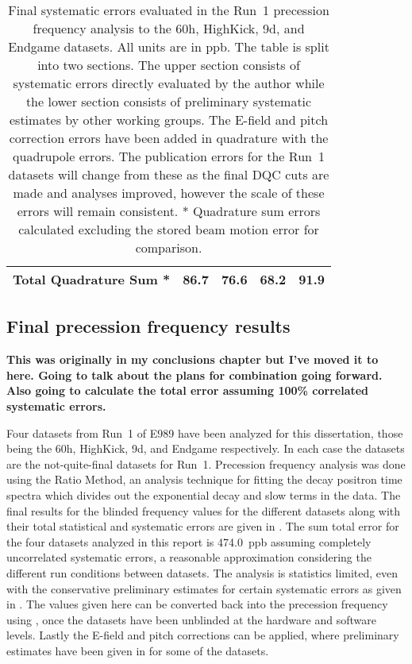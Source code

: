 \begin{table}
\begin{tabular*}{\linewidth}{@{\extracolsep{\fill}}lGGGG}
    Total Quadrature Sum * & 86.7 & 76.6 & 68.2 & 91.9 \\
  \hline
\end{tabular*}
\caption[Systematic errors evaluated in the Run~1 precession frequency datasets]{Final systematic errors evaluated in the Run~1 precession frequency analysis to the 60h, HighKick, 9d, and Endgame datasets. All units are in ppb. The table is split into two sections. The upper section consists of systematic errors directly evaluated by the author while the lower section consists of preliminary systematic estimates by other working groups. The E-field and pitch correction errors have been added in quadrature with the quadrupole errors. The publication errors for the Run~1 datasets will change from these as the final DQC cuts are made and analyses improved, however the scale of these errors will remain consistent. * Quadrature sum errors calculated excluding the stored beam motion error for comparison.}
\label{tab:FinalSystematicErrors}
\end{table}




\subsection{Final precession frequency results}


\textbf{This was originally in my conclusions chapter but I've moved it to here. Going to talk about the plans for combination going forward. Also going to calculate the total error assuming 100\% correlated systematic errors.}



Four datasets from Run~1 of E989 have been analyzed for this dissertation, those being the 60h, HighKick, 9d, and Endgame respectively. In each case the datasets are the not-quite-final datasets for Run~1. Precession frequency analysis was done using the Ratio Method, an analysis technique for fitting the decay positron time spectra which divides out the exponential decay and slow terms in the data. The final results for the blinded frequency \R values for the different datasets along with their total statistical and systematic errors are given in . The sum total error for the four datasets analyzed in this report is \SI{474.0}{ppb} assuming completely uncorrelated systematic errors, a reasonable approximation considering the different run conditions between datasets. The analysis is statistics limited, even with the conservative preliminary estimates for certain systematic errors as given in . The \R values given here can be converted back into the precession frequency \wa using , once the datasets have been unblinded at the hardware and software levels. Lastly the E-field and pitch corrections can be applied, where preliminary estimates have been given in  for some of the datasets. 



